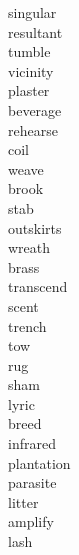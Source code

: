 \documentclass[b5paper, 11pt]{ctexart}
\begin{document}
\begin{multicols*}{3}
\begin{description}
\item[singular]

\item[resultant]

\item[tumble]

\item[vicinity]

\item[plaster]

\item[beverage]

\item[rehearse]

\item[coil]

\item[weave]

\item[brook]

\item[stab]

\item[outskirts]

\item[wreath]

\item[brass]

\item[transcend]

\item[scent]

\item[trench]

\item[tow]

\item[rug]

\item[sham]

\item[lyric]

\item[breed]

\item[infrared]

\item[plantation]

\item[parasite]

\item[litter]

\item[amplify]

\item[lash]


\end{description}
\end{multicols*}
\end{document}
